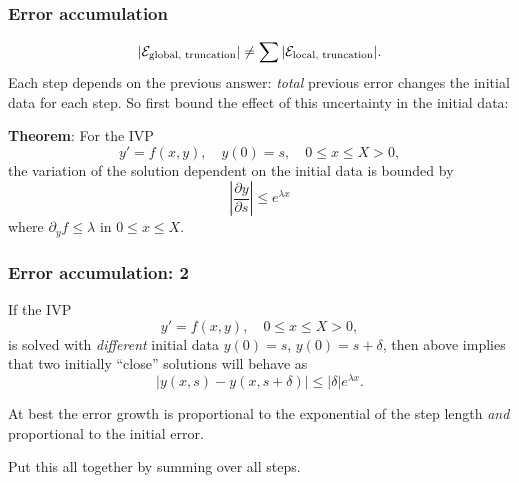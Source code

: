 \documentclass{beamer}
\begin{document}
\begin{frame}
  \frametitle{Error accumulation}

  \begin{equation*}
    |{\cal E}_{\text{global, truncation}}| \ne \sum |{\cal
      E}_{\text{local, truncation}}|.
  \end{equation*}
  Each step depends on the previous answer: \emph{total} previous
  error changes the initial data for each step. \pause So first bound
  the effect of this uncertainty in the initial data:

  \vspace{1ex}

  {\bf Theorem}: For the IVP
  \begin{equation*}
    y' = f(x, y), \quad y(0) = s, \quad 0 \le x \le X > 0,
  \end{equation*}
  the variation of the solution dependent on the initial data is
  bounded by
  \begin{equation*}
    \left| \frac{\partial y}{\partial s} \right| \leq e^{\lambda x}
  \end{equation*}
  where $\partial_y f \leq \lambda$ in $0 \le x \le X$.

\end{frame}

\begin{frame}
  \frametitle{Error accumulation: 2}

  If the IVP
  \begin{equation*}
    y' = f(x, y), \quad 0 \le x \le X > 0,
  \end{equation*}
  is solved with \emph{different} initial data $y(0) = s$, $y(0) = s +
  \delta$, then above implies that two initially ``close'' solutions
  will behave as
  \begin{equation*}
    | y(x, s) - y(x, s + \delta)| \leq |\delta| e^{\lambda x}.
  \end{equation*}
  \pause

  \vspace{1ex}

  At best the error growth is proportional to the exponential of the
  step length \emph{and} proportional to the initial error. \pause

  \vspace{1ex}

  Put this all together by summing over all steps.

\end{frame}
\end{document}
